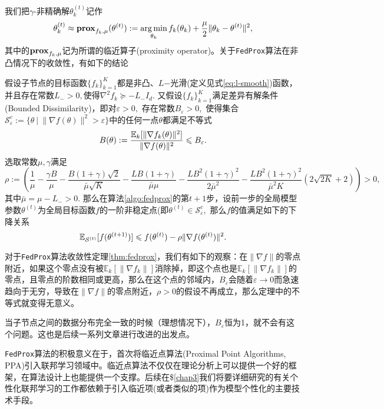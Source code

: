 我们把$\gamma$-非精确解$\theta_k^{(t)}$记作
\begin{equation*}
\theta_k^{(t)} \approx \mathbf{prox}_{f_k, \mu} (\theta^{(t)}) := \operatorname*{arg\,min}\limits_{\theta_k} f_k(\theta_k) + \frac{\mu}{2} \lVert \theta_k - \theta^{(t)} \rVert^2,
\end{equation*}
其中的$\mathbf{prox}_{f_k, \mu}$记为所谓的临近算子(proximity operator)。关于\texttt{FedProx}算法在非凸情况下的收敛性，\parencite{sahu2018fedprox}有如下的结论
\begin{theorem}
\label{thm:fedprox}
假设子节点的目标函数$\{f_k\}_{k=1}^K$都是非凸、$L$−光滑(定义见式\eqref{eq:l-smooth})函数，并且存在常数$L_- > 0,$使得$\nabla^2 f_k \succcurlyeq -L_- I_d.$ 又假设$\{f_k\}_{k=1}^K$满足差异有解条件(Bounded Dissimilarity)，即对$\varepsilon > 0,$ 存在常数$B_{\varepsilon} > 0,$ 使得集合$\mathcal{S}_{\varepsilon}^c := \{ \theta ~|~ \lVert \nabla f(\theta) \rVert^2 > \varepsilon\}$中的任何一点$\theta$都满足不等式
\begin{equation}
\label{eq:fedprox_bdd_dissim}
B(\theta) := \frac{\operatorname*{\mathbb{E}}_k [\lVert \nabla f_k(\theta) \rVert^2]}{\lVert \nabla f(\theta) \rVert^2} \leqslant B_{\varepsilon}.
\end{equation}
选取常数$\mu, \gamma$满足
\begin{equation*}
\rho := \left( \frac{1}{\mu} - \frac{\gamma B}{\mu} - \frac{B(1+\gamma)\sqrt{2}}{\bar{\mu}\sqrt{K}} - \frac{LB(1+\gamma)}{\bar{\mu}\mu} - \frac{LB^2(1+\gamma)^2}{2\bar{\mu}^2} - \frac{LB^2(1+\gamma)^2}{\bar{\mu}^2 K} \left( 2\sqrt{2K} + 2 \right) \right) > 0,
\end{equation*}
其中$\bar{\mu} = \mu - L_- > 0.$ 那么在算法\ref{algo:fedprox}的第$t+1$步，设前一步的全局模型参数$\theta^{(t)}$为全局目标函数$f$的一阶非稳定点(即$\theta^{(t)} \in \mathcal{S}_{\varepsilon}^c,$ 那么$f$的值满足如下的下降关系
\begin{equation*}
\operatorname*{\mathbb{E}}\nolimits_{\mathcal{S}^{(t)}}[f(\theta^{(t+1)})] \leqslant f(\theta^{(t)}) - \rho \lVert \nabla f (\theta^{(t)}) \rVert^2.
\end{equation*}
\end{theorem}

\begin{rem}
对于\texttt{FedProx}算法收敛性定理\ref{thm:fedprox}，我们有如下的观察：在$\lVert \nabla f \rVert$的零点附近，如果这个零点没有被$\mathbb{E}_k[\lVert \nabla f_k \rVert]$消除掉，即这个点也是$\mathbb{E}_k[\lVert \nabla f_k \rVert]$的零点，且零点的阶数相同或更高，那么在这个点的邻域内，$B_{\varepsilon}$会随着$\varepsilon \to 0$而急速趋向于无穷，导致在$\lVert \nabla f \rVert$的零点附近，$\rho > 0$的假设不再成立，那么定理中的不等式就变得无意义。

当子节点之间的数据分布完全一致的时候（理想情况下），$B_{\varepsilon}$恒为1，就不会有这个问题。这也是后续一系列文章\cite{pathak2020fedsplit,tran2021feddr}进行改进的出发点。
\end{rem}

\texttt{FedProx}算法的积极意义在于，首次将临近点算法(Proximal Point Algorithms, PPA)引入联邦学习领域中。临近点算法不仅仅在理论分析上可以提供一个好的框架，在算法设计上也能提供一个支撑。后续在\$\ref{chap3}我们将要详细研究的有关个性化联邦学习的工作\cite{hanzely2020federated,li_2021_ditto,t2020pfedme,li2021pfedmac}都依赖于引入临近项(或者类似的项)作为模型个性化的主要技术手段。

